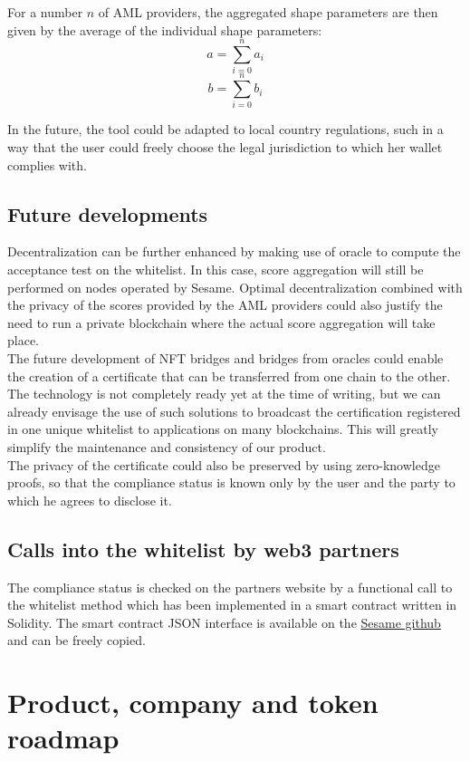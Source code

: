 ﻿\documentclass[a4paper]{article}
\begin{document}
For a number $n$ of AML providers, the aggregated shape parameters are then given by the average of
the individual shape parameters:
$$a=\sum_{i=0}^na_i$$
$$b=\sum_{i=0}^nb_i$$

In the future, the tool could be adapted to local country regulations, such in a way that the user could freely choose the legal jurisdiction to which her wallet complies with.

\subsection{Future developments}
Decentralization can be further enhanced by making use of oracle to compute the acceptance test on the whitelist. In this case, score aggregation will still be performed on nodes operated by Sesame. Optimal decentralization combined with the privacy of the scores provided by the AML providers could also justify the need to run a private blockchain where the actual score aggregation will take place. \\
 
The future development of NFT bridges and bridges from oracles could enable the creation of a certificate that can be transferred from one chain to the other. The technology is not completely ready yet at the time of writing, but we can already envisage the use of such solutions to broadcast the certification registered in one unique whitelist to applications on many blockchains. This will greatly simplify the maintenance and consistency of our product. \\

The privacy of the certificate could also be preserved by using zero-knowledge proofs, so that the
compliance status is known only by the user and the party to which he agrees to disclose it.

\subsection{Calls into the whitelist by web3 partners}
The compliance status is checked on the partners website by a functional call to the whitelist method which has been implemented in a smart contract written in Solidity. The smart contract JSON interface is available on the \href{https://github.com/sesamefi/whitelist}{Sesame github} and can be freely copied.

\section{Product, company and token roadmap}
\end{document}
